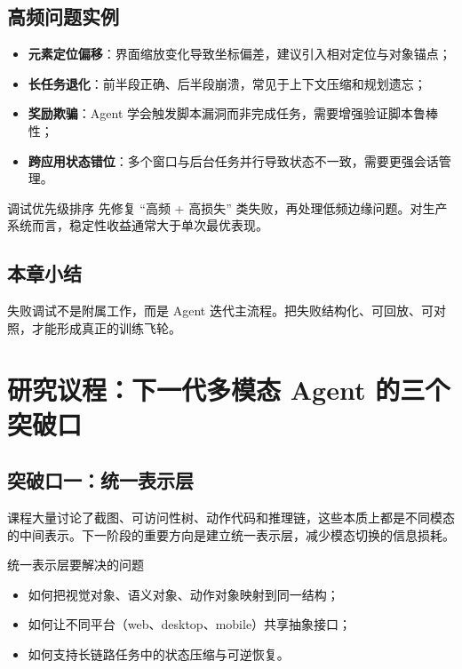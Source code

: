 \documentclass[a4paper]{article}
\begin{document}
\subsection{高频问题实例}
\begin{itemize}
    \item \textbf{元素定位偏移}：界面缩放变化导致坐标偏差，建议引入相对定位与对象锚点；
    \item \textbf{长任务退化}：前半段正确、后半段崩溃，常见于上下文压缩和规划遗忘；
    \item \textbf{奖励欺骗}：Agent 学会触发脚本漏洞而非完成任务，需要增强验证脚本鲁棒性；
    \item \textbf{跨应用状态错位}：多个窗口与后台任务并行导致状态不一致，需要更强会话管理。
\end{itemize}

\begin{importantbox}{调试优先级排序}
先修复 ``高频 + 高损失'' 类失败，再处理低频边缘问题。对生产系统而言，稳定性收益通常大于单次最优表现。
\end{importantbox}

\subsection{本章小结}
失败调试不是附属工作，而是 Agent 迭代主流程。把失败结构化、可回放、可对照，才能形成真正的训练飞轮。

\section{研究议程：下一代多模态 Agent 的三个突破口}

\subsection{突破口一：统一表示层}
课程大量讨论了截图、可访问性树、动作代码和推理链，这些本质上都是不同模态的中间表示。下一阶段的重要方向是建立统一表示层，减少模态切换的信息损耗。

\begin{knowledgebox}{统一表示层要解决的问题}
\begin{itemize}
    \item 如何把视觉对象、语义对象、动作对象映射到同一结构；
    \item 如何让不同平台（web、desktop、mobile）共享抽象接口；
    \item 如何支持长链路任务中的状态压缩与可逆恢复。
\end{itemize}
\end{knowledgebox}
\end{document}
